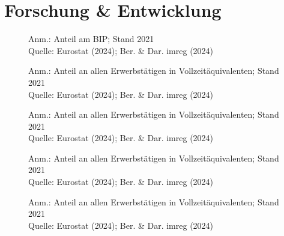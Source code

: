 
\section{Forschung \& Entwicklung}

\begin{figure}[p]
	{\centering {}}
	\label{map:forschausgaben}
	\begin{spacing}{1} \scriptsize
		Anm.: Anteil am BIP; Stand 2021\\
		Quelle: Eurostat (2024); Ber. \& Dar. imreg (2024) \end{spacing}
\end{figure}


\begin{figure}[p]
	{\centering {}}
	\label{map:forscher}
	\begin{spacing}{1} \scriptsize
		Anm.: Anteil an allen Erwerbstätigen in Vollzeitäquivalenten; Stand 2021\\
		Quelle: Eurostat (2024); Ber. \& Dar. imreg (2024) \end{spacing}
\end{figure}


\begin{figure}[p]
	{\centering {}}
	\label{map:forscherunt}
	\begin{spacing}{1} \scriptsize
		Anm.: Anteil an allen Erwerbstätigen in Vollzeitäquivalenten; Stand 2021\\
		Quelle: Eurostat (2024); Ber. \& Dar. imreg (2024) \end{spacing}
\end{figure}


\begin{figure}[p]
	{\centering {}}
	\label{map:forscherhoch}
	\begin{spacing}{1} \scriptsize
		Anm.: Anteil an allen Erwerbstätigen in Vollzeitäquivalenten; Stand 2021\\
		Quelle: Eurostat (2024); Ber. \& Dar. imreg (2024) \end{spacing}
\end{figure}


\begin{figure}[p]
	{\centering {}}
	\label{map:forscherstaat}
	\begin{spacing}{1} \scriptsize
		Anm.: Anteil an allen Erwerbstätigen in Vollzeitäquivalenten; Stand 2021\\
		Quelle: Eurostat (2024); Ber. \& Dar. imreg (2024) \end{spacing}
\end{figure}